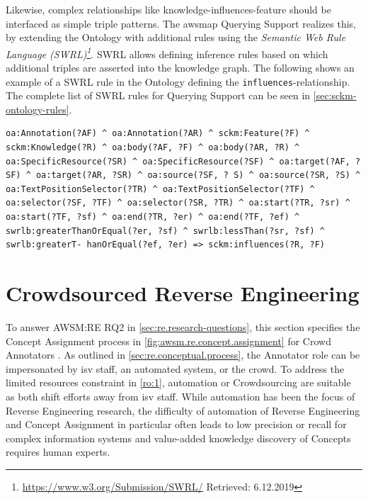 Likewise, complex relationships like knowledge-influences-feature should be interfaced as simple triple patterns.
The \gls{awsmap} Querying Support realizes this, by extending the Ontology with additional rules using the \emph{Semantic Web Rule Language (SWRL)\footnote{\url{https://www.w3.org/Submission/SWRL/} Retrieved: 6.12.2019}}.
SWRL allows defining inference rules based on which additional triples are asserted into the knowledge graph.
The following shows an example of a SWRL rule in the Ontology defining the \texttt{influences}-relationship.
The complete list of SWRL rules for Querying Support can be seen in \cref{sec:sckm-ontology-rules}.

\begin{lstlisting}[language=sparql, captionpos=t, caption=SWRL Rules for sckm:influences, label=lst:swrl]
oa:Annotation(?AF) ^ oa:Annotation(?AR) ^ sckm:Feature(?F) ^ sckm:Knowledge(?R) ^ oa:body(?AF, ?F) ^ oa:body(?AR, ?R) ^ oa:SpecificResource(?SR) ^ oa:SpecificResource(?SF) ^ oa:target(?AF, ?SF) ^ oa:target(?AR, ?SR) ^ oa:source(?SF, ? S) ^ oa:source(?SR, ?S) ^ oa:TextPositionSelector(?TR) ^ oa:TextPositionSelector(?TF) ^ oa:selector(?SF, ?TF) ^ oa:selector(?SR, ?TR) ^ oa:start(?TR, ?sr) ^ oa:start(?TF, ?sf) ^ oa:end(?TR, ?er) ^ oa:end(?TF, ?ef) ^ swrlb:greaterThanOrEqual(?er, ?sf) ^ swrlb:lessThan(?sr, ?sf) ^ swrlb:greaterT- hanOrEqual(?ef, ?er) => sckm:influences(?R, ?F)
\end{lstlisting}

\vspace{-10pt}
\hypertarget{sec:csre}{%
\section{Crowdsourced Reverse Engineering}\label{sec:csre}}
\vspace{10pt}

To answer AWSM:RE RQ2 in \cref{sec:re.research-questions}, this section specifies the \gls{Concept Assignment} process in \cref{fig:awsm.re.concept.assignment} for Crowd Annotators \autocite{Heil2018CSRE,Heil2019CSRECCIS}.
As outlined in \cref{sec:re.conceptual.process}, the Annotator role can be impersonated by \gls{isv} staff, an automated system, or the crowd.
To address the limited resources constraint in \cref{ro:1}, automation or \gls{Crowdsourcing} are suitable as both shift efforts away from \gls{isv} staff.
While automation has been the focus of \gls{Reverse Engineering} research, the difficulty of automation of \gls{Reverse Engineering} and \gls{Concept Assignment} in particular often leads to low precision or recall \autocite{Canfora2007ReverseEngineering} for complex information systems and value-added knowledge discovery of \glspl{Concept} requires human experts.

